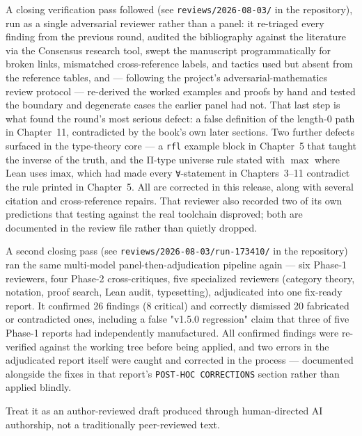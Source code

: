 A closing verification pass followed (see
\texttt{reviews/2026-08-03/} in the repository), run as a single
adversarial reviewer rather than a panel: it re-triaged every finding from
the previous round, audited the bibliography against the literature via the
Consensus research tool, swept the manuscript programmatically for broken
links, mismatched cross-reference labels, and tactics used but absent from
the reference tables, and --- following the project's
adversarial-mathematics review protocol --- re-derived the worked examples
and proofs by hand and tested the boundary and degenerate cases the earlier
panel had not. That last step is what found the round's most serious defect:
a false definition of the length-\(0\) path in Chapter~11, contradicted by
the book's own later sections. Two further defects surfaced in the
type-theory core --- a \texttt{rfl} example block in Chapter~5 that taught
the inverse of the truth, and the Π-type universe rule stated with
\(\max\) where Lean uses \(\mathrm{imax}\), which had made every
\texttt{∀}-statement in Chapters~3--11 contradict the rule printed in
Chapter~5. All are corrected in this release, along with several citation
and cross-reference repairs. That reviewer also recorded two of its own
predictions that testing against the real toolchain disproved; both are
documented in the review file rather than quietly dropped.

A second closing pass (see \texttt{reviews/2026-08-03/run-173410/} in the
repository) ran the same multi-model panel-then-adjudication pipeline
again --- six Phase-1 reviewers, four Phase-2 cross-critiques, five
specialized reviewers (category theory, notation, proof search, Lean
audit, typesetting), adjudicated into one fix-ready report. It confirmed
26 findings (8 critical) and correctly dismissed 20 fabricated or
contradicted ones, including a false "v1.5.0 regression" claim that three
of five Phase-1 reports had independently manufactured. All confirmed
findings were re-verified against the working tree before being applied,
and two errors in the adjudicated report itself were caught and corrected
in the process --- documented alongside the fixes in that report's
\texttt{POST-HOC CORRECTIONS} section rather than applied blindly.

Treat it as an author-reviewed draft produced through human-directed AI
authorship, not a traditionally peer-reviewed text.

